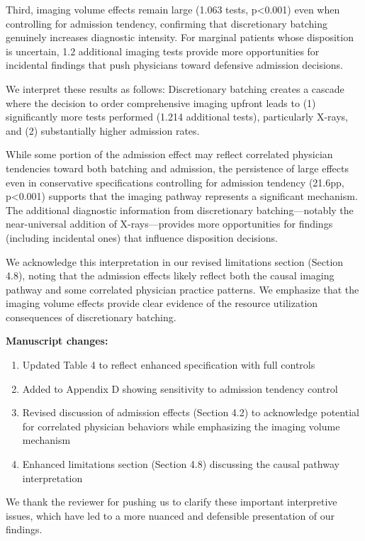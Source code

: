 \documentclass[11pt]{article}
\newcommand{\1}{\hbox{\rm 1\kern-.35em 1}}
\begin{document}
Third, imaging volume effects remain large (1.063 tests, p<0.001) even when controlling for admission tendency, confirming that discretionary batching genuinely increases diagnostic intensity. For marginal patients whose disposition is uncertain, 1.2 additional imaging tests provide more opportunities for incidental findings that push physicians toward defensive admission decisions.

We interpret these results as follows: Discretionary batching creates a cascade where the decision to order comprehensive imaging upfront leads to (1) significantly more tests performed (1.214 additional tests), particularly X-rays, and (2) substantially higher admission rates. 

While some portion of the admission effect may reflect correlated physician tendencies toward both batching and admission, the persistence of large effects even in conservative specifications controlling for admission tendency (21.6pp, p<0.001) supports that the imaging pathway represents a significant mechanism. The additional diagnostic information from discretionary batching—notably the near-universal addition of X-rays—provides more opportunities for findings (including incidental ones) that influence disposition decisions.

We acknowledge this interpretation in our revised limitations section (Section 4.8), noting that the admission effects likely reflect both the causal imaging pathway and some correlated physician practice patterns. We emphasize that the imaging volume effects provide clear evidence of the resource utilization consequences of discretionary batching.

\textbf{Manuscript changes:}

\begin{enumerate}
\item Updated Table 4 to reflect enhanced specification with full controls
\item Added to Appendix D showing sensitivity to admission tendency control
\item Revised discussion of admission effects (Section 4.2) to acknowledge potential for correlated physician behaviors while emphasizing the imaging volume mechanism
\item Enhanced limitations section (Section 4.8) discussing the causal pathway interpretation
\end{enumerate}

We thank the reviewer for pushing us to clarify these important interpretive issues, which have led to a more nuanced and defensible presentation of our findings.
\color{black}
\end{document}
